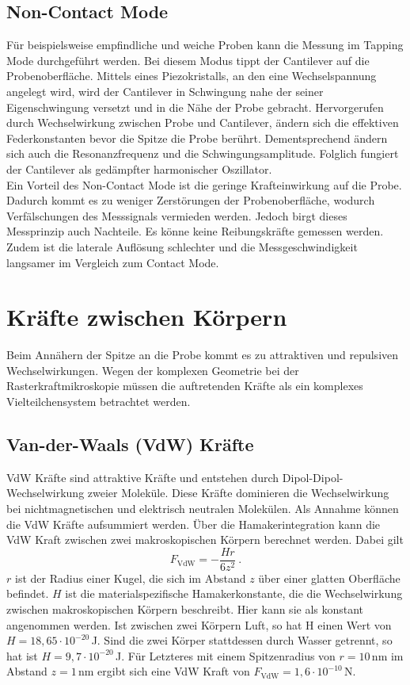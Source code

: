 \subsection{Non-Contact Mode}
Für beispielsweise empfindliche und weiche Proben kann die Messung im Tapping Mode durchgeführt werden. Bei diesem Modus tippt der Cantilever auf die Probenoberfläche. Mittels eines Piezokristalls, an den eine Wechselspannung angelegt wird, wird der Cantilever in Schwingung nahe der seiner Eigenschwingung versetzt und in die Nähe der Probe gebracht. Hervorgerufen durch Wechselwirkung zwischen Probe und Cantilever, ändern sich die effektiven Federkonstanten bevor die Spitze die Probe berührt. Dementsprechend ändern sich auch die Resonanzfrequenz und die Schwingungsamplitude. Folglich fungiert der Cantilever als gedämpfter harmonischer Oszillator.\\
Ein Vorteil des Non-Contact Mode ist die geringe Krafteinwirkung auf die Probe. Dadurch kommt es zu weniger Zerstörungen der Probenoberfläche, wodurch Verfälschungen des Messsignals vermieden werden. Jedoch birgt dieses Messprinzip auch Nachteile. Es könne keine Reibungskräfte gemessen werden. Zudem ist die laterale Auflösung schlechter und die Messgeschwindigkeit langsamer im Vergleich zum Contact Mode.


\section{Kräfte zwischen Körpern}
Beim Annähern der Spitze an die Probe kommt es zu attraktiven und repulsiven Wechselwirkungen. Wegen der komplexen Geometrie bei der Rasterkraftmikroskopie müssen die auftretenden Kräfte als ein komplexes Vielteilchensystem betrachtet werden. 

\subsection{Van-der-Waals (VdW) Kräfte}
VdW Kräfte sind attraktive Kräfte und entstehen durch Dipol-Dipol-Wechselwirkung zweier Moleküle. Diese Kräfte dominieren die Wechselwirkung bei nichtmagnetischen und elektrisch neutralen Molekülen. Als Annahme können die VdW Kräfte aufsummiert werden. Über die Hamakerintegration kann die VdW Kraft zwischen zwei makroskopischen Körpern berechnet werden. Dabei gilt
$$F_\text{VdW}=-\frac{Hr}{6z^{2}}~.$$
$r$ ist der Radius einer Kugel, die sich im Abstand $z$ über einer glatten Oberfläche befindet. $H$ ist die materialspezifische Hamakerkonstante, die die Wechselwirkung zwischen makroskopischen Körpern beschreibt. Hier kann sie als konstant angenommen werden. Ist zwischen zwei Körpern Luft, so hat H einen Wert von $H=18,65 \cdot 10^{-20}\,$J. Sind die zwei Körper stattdessen durch Wasser getrennt, so hat ist $H=9,7 \cdot 10^{-20}\,$J. Für Letzteres mit einem Spitzenradius von $r=10\,$nm im Abstand $z=1\,$nm ergibt sich eine VdW Kraft von $F_\text{VdW}=1,6 \cdot 10^{-10}\,$N.

